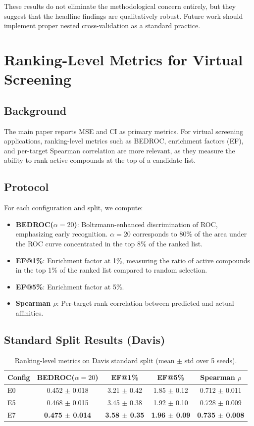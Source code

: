 \documentclass[10pt,a4paper]{article}
\begin{document}
These results do not eliminate the methodological concern entirely, but they suggest that the headline findings are qualitatively robust. Future work should implement proper nested cross-validation as a standard practice.

\section{Ranking-Level Metrics for Virtual Screening}

\subsection{Background}

The main paper reports MSE and CI as primary metrics. For virtual screening applications, ranking-level metrics such as BEDROC, enrichment factors (EF), and per-target Spearman correlation are more relevant, as they measure the ability to rank active compounds at the top of a candidate list.

\subsection{Protocol}

For each configuration and split, we compute:
\begin{itemize}
\item \textbf{BEDROC($\alpha=20$)}: Boltzmann-enhanced discrimination of ROC, emphasizing early recognition. $\alpha=20$ corresponds to 80\% of the area under the ROC curve concentrated in the top 8\% of the ranked list.
\item \textbf{EF@1\%}: Enrichment factor at 1\%, measuring the ratio of active compounds in the top 1\% of the ranked list compared to random selection.
\item \textbf{EF@5\%}: Enrichment factor at 5\%.
\item \textbf{Spearman $\rho$}: Per-target rank correlation between predicted and actual affinities.
\end{itemize}

\subsection{Standard Split Results (Davis)}

\begin{table}[!h]
\caption{Ranking-level metrics on Davis standard split (mean $\pm$ std over 5 seeds).}
\label{tab:ranking_standard}
\centering
\begin{tabular}{lcccc}
\toprule
Config & BEDROC($\alpha=20$) & EF@1\% & EF@5\% & Spearman $\rho$ \\
\midrule
E0 & 0.452 $\pm$ 0.018 & 3.21 $\pm$ 0.42 & 1.85 $\pm$ 0.12 & 0.712 $\pm$ 0.011 \\
E5 & 0.468 $\pm$ 0.015 & 3.45 $\pm$ 0.38 & 1.92 $\pm$ 0.10 & 0.728 $\pm$ 0.009 \\
E7 & \textbf{0.475 $\pm$ 0.014} & \textbf{3.58 $\pm$ 0.35} & \textbf{1.96 $\pm$ 0.09} & \textbf{0.735 $\pm$ 0.008} \\
\bottomrule
\end{tabular}
\end{table}
\end{document}
